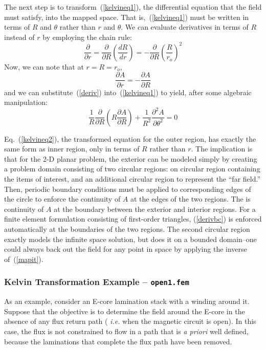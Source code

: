\documentclass[12pt]{report}
\begin{document}
The next step is to transform~(\ref{kelvineq1}), the differential
equation that the field must satisfy, into the mapped space. That
is,~(\ref{kelvineq1}) must be written in terms of $R$ and $\theta$ rather
than $r$ and $\theta$.  We can evaluate derivatives in terms of $R$
instead of $r$ by employing the chain rule:
\begin{equation} \label{deriv}
\frac{\partial}{\partial r} = \frac{\partial}{\partial R} \left(
\frac{d R}{d r} \right) = -\frac{\partial}{\partial R} \left(
\frac{R}{r_o} \right)^2
\end{equation}
Now, we can note that at $r=R=r_o$,
\begin{equation} \label{derivbc}
\frac{\partial A}{\partial r} = -\frac{\partial A}{\partial R}
\end{equation}
and we can substitute~(\ref{deriv}) into~(\ref{kelvineq1}) to yield,
after some algebraic manipulation:
\begin{equation} \label{kelvineq2}
\frac{1}{R} \frac{\partial}{\partial R} \left( R \frac{\partial
A}{\partial R} \right) + \frac{1}{R^2} \frac{\partial^2 A}{\partial
\theta^2} = 0
\end{equation}

Eq.~(\ref{kelvineq2}), the transformed equation for the outer region, has
exactly the same form as inner region, only in terms of $R$ rather
than $r$.  The implication is that for the 2-D planar problem, the
exterior can be modeled simply by creating a problem domain
consisting of two circular regions:  on circular region containing
the items of interest, and an additional circular region to
represent the ``far field.'' Then, periodic boundary conditions
must be applied to corresponding edges of the circle to enforce the
continuity of $A$ at the edges of the two regions.  The is
continuity of $A$ at the boundary between the exterior and interior
regions.  For a finite element formulation consisting of
first-order triangles, (\ref{derivbc}) is enforced automatically at
the boundaries of the two regions.  The second circular region
exactly models the infinite space solution, but does it on a
bounded domain--one could always back out the field for any point
in space by applying the inverse of~(\ref{mapit}).

\subsubsection{Kelvin Transformation Example -- {\tt open1.fem}}

As an example, consider an E-core lamination stack with a winding
around it.  Suppose that the objective is to determine the field
around the E-core in the absence of any flux return path ({\em
i.e.} when the magnetic circuit is open).  In this case, the flux
is not constrained to flow in a path that is {\em a priori} well
defined, because the laminations that complete the flux path have
been removed.
\end{document}

